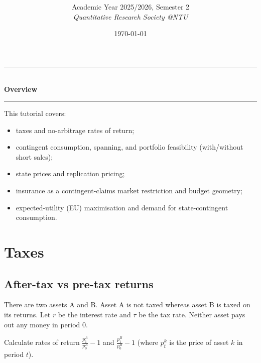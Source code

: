 \documentclass[12pt]{article}
\title{
\CourseCode \CourseName \\[0.3em]
\large \DocType
}
\author{
  Academic Year 2025/2026, Semester 2 \\[0.25em]
  \textit{Quantitative Research Society @NTU}
}
\date{\today}
\begin{document}
\maketitle
\thispagestyle{plainfirst}
\pagestyle{main}
\bigskip

\begin{center}
  \rule{0.8\textwidth}{0.4pt}\\[4pt]
  \textbf{Overview}\\[2pt]
  \rule{0.8\textwidth}{0.4pt}
\end{center}

\noindent
This tutorial covers:
\begin{itemize}[leftmargin=*]
  \item taxes and no-arbitrage rates of return;
  \item contingent consumption, spanning, and portfolio feasibility (with/without short sales);
  \item state prices and replication pricing;
  \item insurance as a contingent-claims market restriction and budget geometry;
  \item expected-utility (EU) maximisation and demand for state-contingent consumption.
\end{itemize}

\bigskip

\newpage
\tableofcontents

\newpage
\section{Taxes}

\subsection{After-tax vs pre-tax returns}
There are two assets A and B. Asset A is not taxed whereas asset B is taxed on its returns.
Let \(r\) be the interest rate and \(\tau\) be the tax rate. Neither asset pays out any money in period
0.

Calculate rates of return \(\frac{p^A_1}{p^A_0}-1\) and \(\frac{p^B_1}{p^B_0}-1\) (where \(p^k_t\)
is the price of asset \(k\) in period \(t\)).
\end{document}

